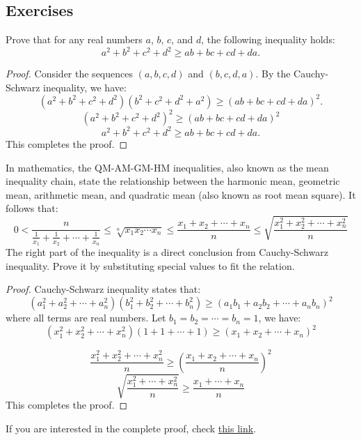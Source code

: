 \subsection{Exercises}
\begin{exercise}
    Prove that for any real numbers \( a \), \( b \), \( c \), and \( d \), the following inequality holds:
    \[
    a^2 + b^2 + c^2 + d^2 \geq ab + bc + cd + da.
    \]
\end{exercise}
\begin{proof}
    Consider the sequences \( (a, b, c, d) \) and \( (b, c, d, a) \). By the Cauchy-Schwarz inequality, we have:
    \[
    (a^2 + b^2 + c^2 + d^2)(b^2 + c^2 + d^2 + a^2) \geq (ab + bc + cd + da)^2.
    \]
    $$\left(a^2+b^2+c^2+d^2\right)^2 \geq (ab + bc + cd + da)^2$$
    \[
    a^2 + b^2 + c^2 + d^2 \geq ab + bc + cd + da.
    \]
    This completes the proof.
\end{proof}
\begin{exercise}
    In mathematics, the QM-AM-GM-HM inequalities, also known as the mean inequality chain, state the relationship between the harmonic mean, geometric mean, arithmetic mean, and quadratic mean (also known as root mean square).
    It follows that:
    \begin{equation}
        0<\frac{n}{\frac{1}{x_{1}}+\frac{1}{x_{2}}+\cdots+\frac{1}{x_{n}}} \leq \sqrt[n]{x_{1} x_{2} \cdots x_{n}} \leq \frac{x_{1}+x_{2}+\cdots+x_{n}}{n} \leq \sqrt{\frac{x_{1}^{2}+x_{2}^{2}+\cdots+x_{n}^{2}}{n}}
    \end{equation}
    The right part of the inequality is a direct conclusion from Cauchy-Schwarz inequality. Prove it by
    substituting special values to fit the relation.
\end{exercise}
\begin{proof}
    Cauchy-Schwarz inequality states that:
    $$\left(a_{1}^{2}+a_{2}^{2}+\cdots+a_{n}^{2}\right)\left(b_{1}^{2}+b_{2}^{2}+\cdots+b_{n}^{2}\right) \geq\left(a_{1} b_{1}+a_{2} b_{2}+\cdots+a_{n} b_{n}\right)^{2}$$
    where all terms are real numbers.
    Let $b_1=b_2=\cdots=b_n=1$, we have:
    $$\left(x_{1}^{2}+x_{2}^{2}+\cdots+x_{n}^{2}\right)(1+1+\cdots+1) \geq\left(x_{1}+x_{2}+\cdots+x_{n}\right)^{2}$$

    $$\frac{x_{1}^{2}+x_{2}^{2}+\cdots+x_{n}^{2}}{n} \geq\left(\frac{x_{1}+x_{2}+\cdots+x_{n}}{n}\right)^{2}$$
    $$\sqrt{\frac{x_{1}^{2}+\cdots+x_{n}^{2}}{n}} \geq \frac{x_{1}+\cdots+x_{n}}{n}$$
    This completes the proof.
\end{proof}
If you are interested in the complete proof, check \href{https://artofproblemsolving.com/wiki/index.php/Root-Mean_Square-Arithmetic_Mean-Geometric_Mean-Harmonic_mean_Inequality}{this link}.
